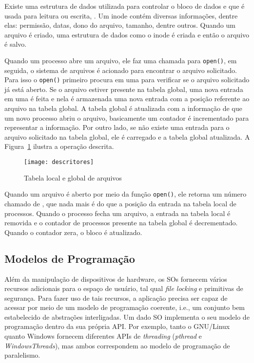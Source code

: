 Existe uma estrutura de dados utilizada para controlar o bloco de dados e que é
usada para leitura ou escrita, . Um inode contém diversas
informações, dentre elas: permissão, datas, dono do arquivo, tamanho, dentre
outros. Quando um arquivo é criado, uma estrutura de dados como o inode é
criada e então o arquivo é salvo.

Quando um processo abre um arquivo, ele faz uma chamada para \texttt{open()}, em
seguida, o sistema de arquivos é acionado para encontrar o arquivo solicitado.
Para isso o \texttt{open()} primeiro procura em uma  para verificar se o arquivo solicitado já está aberto. Se o
arquivo estiver presente na tabela global, uma nova entrada em uma
 é feita e nela é
armazenada uma nova entrada com a posição referente ao arquivo na tabela
global. A tabela global é atualizada com a informação de que um novo processo
abriu o arquivo, basicamente um contador é incrementado para representar a
informação. Por outro lado, se não existe uma entrada para o arquivo solicitado
na tabela global, ele é carregado e a tabela global atualizada. A
Figura~\ref{fig:descritores} ilustra a operação descrita.
 
\begin{figure}[!h]
  \centering
  \texttt{[image: descritores]} 
  \caption{Tabela local e global de arquivos}
  \label{fig:descritores} 
\end{figure}

Quando um arquivo é aberto por meio da função \texttt{open()}, ele retorna um
número chamado de ,
que nada mais é do que a posição da entrada na tabela local de processos.
Quando o processo fecha um arquivo, a entrada na tabela local é removida e o
contador de processos presente na tabela global é decrementado. Quando o
contador zera, o bloco é atualizado.

\subsection{Modelos de Programação}

Além da manipulação de dispositivos de hardware, os SOs fornecem vários
recursos adicionais para o espaço de usuário, tal qual \emph{file locking} e
primitivas de segurança. Para fazer uso de tais recursos, a aplicação precisa
ser capaz de acessar por meio de um modelo de programação coerente, i.e., um
conjunto bem estabelecido de abstrações interligadas. Um dado SO implementa o
seu modelo de programação dentro da sua própria API. Por exemplo, tanto o
GNU/Linux quanto Windows fornecem diferentes APIs de \emph{threading}
(\emph{pthread} e \emph{WindowsThreads}), mas ambos correspondem ao modelo de
programação de paralelismo.

